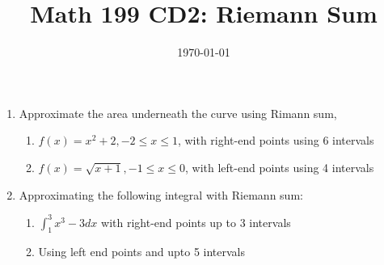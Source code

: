 




\title{Math 199 CD2: Riemann Sum}
\date{\today}



	
	\maketitle
	\begin{enumerate}
		\item Approximate the area underneath the curve using Rimann sum,
		\begin{enumerate}
			\item $f(x)=x^2+2, -2\leq x\leq 1$, with right-end points using 6 intervals
			\vskip 6cm
			\item $f(x)=\sqrt{x+1}, -1\leq x\leq 0$, with left-end points using 4 intervals
			\vskip 6cm
		\end{enumerate}
		\newpage
		
		\item Approximating the following integral with Riemann sum:
		\begin{enumerate}
			\item $\int_1^3x^3-3 dx$ with right-end points up to 3 intervals
			\vskip 6cm
			\item Using left end points and upto 5 intervals 
		\end{enumerate}
	\end{enumerate}
